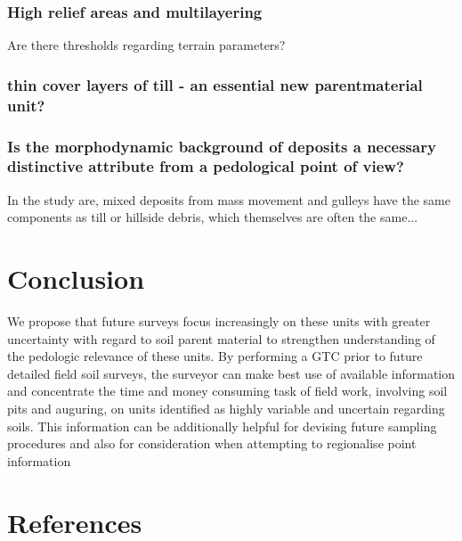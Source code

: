 \documentclass[preprint,12pt,authoryear]{elsarticle}
\begin{document}
\subsubsection{High relief areas and multilayering}
Are there thresholds regarding terrain parameters?
\subsubsection{thin cover layers of till - an essential new parentmaterial unit?}

\subsubsection{Is the morphodynamic background of deposits a necessary distinctive attribute from a pedological point of view?}
In the study are, mixed deposits from mass movement and gulleys have the same components as till or hillside debris, which themselves are often the same...

\section{Conclusion}
We propose that future surveys focus increasingly on these units with greater uncertainty with regard to soil parent material to strengthen understanding of the pedologic relevance of these units. By performing a GTC prior to future detailed field soil surveys, the surveyor can make best use of available information and concentrate the time and money consuming task of field work, involving soil pits and auguring, on units identified as highly variable and uncertain regarding soils. This information can be additionally helpful for devising future sampling procedures and also for consideration when attempting to regionalise point information

\section*{References}

\end{document}

